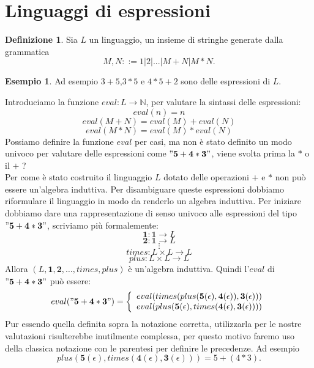 \documentclass{article}
\theoremstyle{definition}
\theoremstyle{definition}
\theoremstyle{definition}
\newtheorem{definition}[theorem]{Definizione}
\newtheorem{example}[theorem]{Esempio}
\theoremstyle{remark}
\begin{document}
    \section{Linguaggi di espressioni}
    \begin{definition}
        Sia $L$ un linguaggio, un insieme di stringhe generate dalla grammatica
        $$M,N ::= 1|2|...|M+N|M*N.$$
    \end{definition}
    \begin{example}
        Ad esempio $3+5$,$3*5$ e $4*5+2$ sono delle espressioni di $L$.
    \end{example}
    Introduciamo la funzione $eval:L\to \mathbb{N}$, per valutare la sintassi delle espressioni:
    $$eval(n) = n$$
    $$eval(M+N) = eval(M) + eval(N)$$
    $$eval(M*N) = eval(M) * eval(N)$$
    Possiamo definire la funzione $eval$ per casi, ma non è stato definito un modo univoco per
    valutare delle espressioni come $\mathbf{"5+4*3"}$, viene svolta prima la $*$ o il $+$ ?\\ Per come è stato costruito il linguaggio $L$ dotato delle operazioni $+$ e $*$ non può essere un'algebra induttiva. Per disambiguare queste espressioni dobbiamo riformulare  il linguaggio in modo da renderlo un algebra induttiva.
    Per iniziare dobbiamo dare una rappresentazione di senso univoco alle espressioni del tipo $\mathbf{"5+4*3"}$, scriviamo più formalemente:
    $$\mathbf{1}:\mathds{1}\to L$$
    $$\mathbf{2}:\mathds{1}\to L$$
    $$\vdots$$
    $$times:L\times L\to L$$
    $$plus :L\times L\to L$$
    Allora $(L,\mathbf{1},\mathbf{2},\dots,times,plus)$ è un'algebra induttiva.
    \newpage
    Quindi l'$eval$ di  $\mathbf{"5+4*3"}$ può essere:
$$eval(\mathbf{"5+4*3"}) = \left\{ \begin{array}{cl}
        eval(times(plus(\mathbf{5}(\epsilon),\mathbf{4}(\epsilon)),\mathbf{3}(\epsilon))) \\
        eval(plus(\mathbf{5}(\epsilon),times(\mathbf{4}(\epsilon),\mathbf{3}(\epsilon))))
    \end{array}\right.$$
Pur essendo quella definita sopra la notazione corretta, utilizzarla per le nostre valutazioni risulterebbe
inutilmente complessa, per questo motivo faremo uso della classica notazione con le parentesi per definire le precedenze.
Ad esempio $$plus(\mathbf{5}(\epsilon),times(\mathbf{4}(\epsilon),\mathbf{3}(\epsilon))) = 5+(4*3).$$
\end{document}
